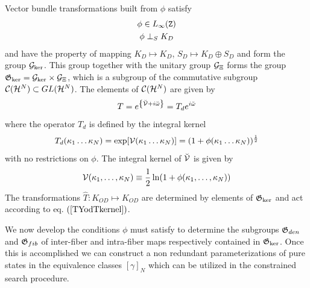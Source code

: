 Vector bundle transformations built from $\phi $ satisfy 
\begin{gather}
\phi \in L_{\infty }({\tt Z})  \nonumber \\
\phi \perp _{S}K_{D}  \label{phiprop}
\end{gather}%
and have the property of mapping $K_{D}\mapsto K_{D}$, $S_{D}\mapsto
K_{D}\oplus S_{D}$ and form the group ${\cal G}_{\ker }$. This group
together with the unitary group ${\cal G}_{\Xi }$ forms the group ${\frak G}%
_{\ker }={\cal G}_{\ker }\times {\cal G}_{\Xi }$, which is a subgroup of the
commutative subgroup ${\cal C}({\cal H}^{N})\subset GL({\cal H}^{N})$. The
elements of ${\cal C}({\cal H}^{N})$ are given by 
\begin{equation}
T=e^{\left\{ {\cal \breve{V}}+i\breve{\omega}\right\} }=T_{d}e^{i\breve{%
\omega}}
\end{equation}%
where the operator $T_{d}$ is defined by the integral kernel 
\begin{equation}
T_{d}(\kappa _{1}\ldots \kappa _{N})=\exp [{\cal V}(\kappa _{1}\ldots \kappa
_{N})]=(1+\phi (\kappa _{1}\ldots \kappa _{N}))^{\frac{1}{2}}
\end{equation}%
with no restrictions on $\phi $. The integral kernel of ${\cal \breve{V}}$
is given by 
\begin{equation}
{\cal V}(\kappa _{1},\ldots ,\kappa _{N})\equiv \frac{1}{2}\ln (1+\phi
(\kappa _{1},\ldots ,\kappa _{N}))  \label{Vhalfln}
\end{equation}%
The transformations $\hat{T}:K_{OD}\mapsto K_{OD}$ are determined by
elements of ${\frak G}_{\ker }$ and act according to eq. $\left( \ref%
{TYodTkernel}\right) $.

We now develop the conditions $\phi $ must satisfy to determine the
subgroups ${\frak G}_{den}$ and ${\frak G}_{fib}$ of inter-fiber and
intra-fiber maps respectively contained in ${\frak G}_{\ker }$. Once this is
accomplished we can construct a non redundant parameterizations of pure
states in the equivalence classes $\left[ \gamma \right] _{N}$ which can be
utilized in the constrained search procedure.

